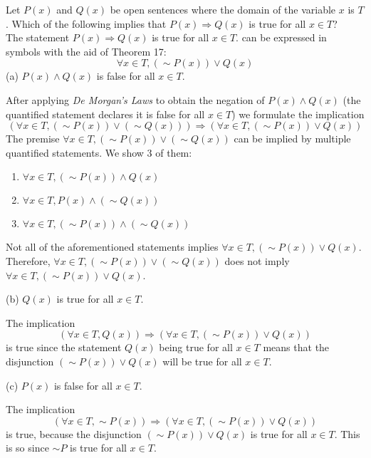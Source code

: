 \documentclass[12pt]{article}
\newenvironment{problem}[2][Problem]{\begin{trivlist}
		\item[\hskip \labelsep {\bfseries #1}\hskip \labelsep {\bfseries #2.}]}{\end{trivlist}}
\newenvironment{solution}[2][Solution]{\begin{trivlist}
		\item[\hskip \labelsep {\bfseries #1}\hskip \labelsep {\bfseries #2.}]}{\end{trivlist}}
\begin{document}
\begin{problem}{73}
	Let $P(x)$ and $Q(x)$ be open sentences where the domain of the variable $x$ is $T$. Which of the following implies that $P(x)\Rightarrow Q(x)$ is true for all $x \in T$?\\
	The statement $P(x)\Rightarrow Q(x)$ is true for all $x \in T$. can be expressed in symbols with the aid of Theorem 17:
	\begin{equation*}
		\forall x \in T, (\sim P(x))\vee Q(x)
	\end{equation*}
	(a) $P(x)\wedge Q(x)$ is false for all $x\in T$.
	\begin{solution}{a}
		After applying \textit{De Morgan's Laws} to obtain the negation of $P(x)\wedge Q(x)$ (the quantified statement declares it is false for all $x\in T$) we formulate the implication
		\begin{equation*}
			(\forall x \in T, (\sim P(x))\vee (\sim Q(x)))\Rightarrow (\forall x \in T, (\sim P(x))\vee Q(x))
		\end{equation*}
	The premise $\forall x \in T, (\sim P(x))\vee (\sim Q(x))$ can be implied by multiple quantified statements. We show 3 of them:
	\begin{enumerate}
		\item $\forall x\in T, (\sim P(x)) \wedge Q(x)$
		\item $\forall x \in T, P(x) \wedge (\sim Q(x))$
		\item $\forall x \in T, (\sim P(x))\wedge (\sim Q(x))$
	\end{enumerate}
	Not all of the aforementioned statements implies $\forall x \in T, (\sim P(x))\vee Q(x)$. Therefore, $\forall x \in T, (\sim P(x))\vee (\sim Q(x))$ does not imply $\forall x \in T, (\sim P(x))\vee Q(x)$.
	\end{solution}

(b) $Q(x)$ is true for all $x \in T.$
\begin{solution}{b}
	The implication
	\begin{equation*}
		(\forall x \in T, Q(x)) \Rightarrow (\forall x \in T, (\sim P(x))\vee Q(x))
	\end{equation*}
	is true since the statement $Q(x)$ being true for all $x \in T$ means that the disjunction $(\sim P(x))\vee Q(x)$ will be true for all $x \in T$.
\end{solution}

(c) $P(x)$ is false for all $x \in T$.
\begin{solution}{c}
	The implication
	\begin{equation*}
		(\forall x \in T, \sim P(x))\Rightarrow (\forall x \in T, (\sim P(x))\vee Q(x))
	\end{equation*}
is true, because the disjunction $(\sim P(x))\vee Q(x)$ is true for all $x \in T$. This is so since $\sim P$ is true for all $x \in T$.
\end{solution}


\end{problem}
\end{document}
